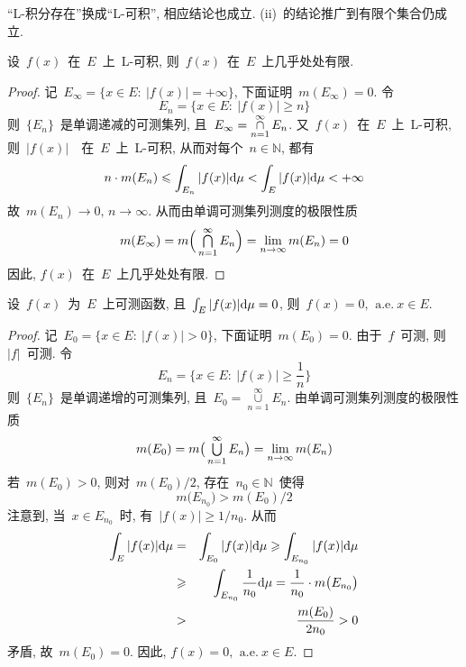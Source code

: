 \begin{remark}
``L-积分存在''换成``L-可积'', 相应结论也成立. (ii)~的结论推广到有限个集合仍成立.
\end{remark}

\begin{theorem}
设~$f(x)$~在~$E$~上~L-可积, 则~$f(x)$~在~$E$~上几乎处处有限.
\end{theorem}

\begin{proof}
记~$E_\infty = \{x \in E: \: |f(x)| = +\infty\}$, 下面证明~$m(E_\infty) = 0$. 令
\[
E_n = \{x \in E: \: |f(x)| \geqslant n\}
\]
则~$\{E_n\}$~是单调递减的可测集列, 且~$E_\infty = \mathop{\mathop{\cap}}\limits_{n=1}^\infty E_n$. 又~$f(x)$~在~$E$~上~L-可积, 则~$|f(x)|$~~在~$E$~上~L-可积, 从而对每个~$n \in \mathbb{N}$, 都有
\[
n \cdot m(E_n) \leqslant \int_{E_n} |f(x)| \mathrm{d} \mu < \int_E |f(x)| \mathrm{d} \mu < +\infty
\]
故~$m(E_n) \to 0,\, n \to \infty$. 从而由单调可测集列测度的极限性质
\[
m(E_\infty) = m\Big( \mathop{\textstyle{\bigcap}}_{n=1}^\infty E_n \Big) = \lim_{n \to \infty} m(E_n) = 0
\]
因此, $f(x)$~在~$E$~上几乎处处有限.
\end{proof}

\begin{theorem} \label{thm425}
设~$f(x)$~为~$E$~上可测函数, 且~$\int_E |f(x)| \mathrm{d} \mu = 0$, 则~$f(x) = 0, \, \mathrm{~a.e.~} x \in E$.
\end{theorem}

\begin{proof}
记~$E_0 = \{x \in E: \: |f(x)| > 0\}$, 下面证明~$m(E_0) = 0$. 由于~$f$~可测, 则~$|f|$~可测. 令
\[
E_n = \Big\{x \in E: \: |f(x)| \geqslant \frac{1}{n}\Big\}
\]
则~$\{E_n\}$~是单调递增的可测集列, 且~$E_0 = \mathop{\cup}\limits_{n=1}^\infty E_n$. 由单调可测集列测度的极限性质
\[
m(E_0) = m\big(\mathop{\textstyle{\bigcup}}_{n=1}^\infty E_n\big) = \lim_{n \to \infty} m(E_n)
\]
若~$m(E_0) > 0$, 则对~$m(E_0)/2$, 存在~$n_0 \in \mathbb{N}$~使得
\[
m\big(E_{n_0}\big) > m(E_0)/2
\]
注意到, 当~$x \in E_{n_0}$~时, 有~$|f(x)| \geqslant 1/n_0$. 从而
\begin{eqnarray*}
\int_E |f(x)| \mathrm{d} \mu &=& \int_{E_0} |f(x)| \mathrm{d} \mu \geqslant \int_{E_{n_0}} |f(x)| \mathrm{d} \mu \\
&\geqslant& \int_{E_{n_0}} \frac{1}{n_0} \mathrm{d} \mu = \frac{1}{n_0} \cdot m\big(E_{n_0}\big) \\
&>& \frac{m(E_0)}{2n_0} > 0
\end{eqnarray*}
矛盾, 故~$m(E_0) = 0$. 因此, $f(x) = 0, \, \mathrm{~a.e.~} x \in E$.
\end{proof}

